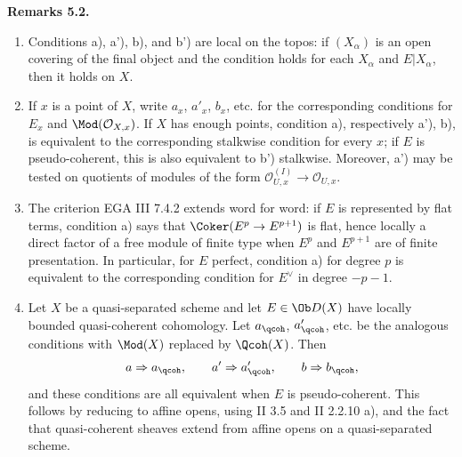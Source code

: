 \textbf{Remarks 5.2.}
\begin{enumerate}[label=\roman*)]
\item Conditions a), a'), b), and b') are local on the topos: if \((X_\alpha)\) is an open covering of the final object and the condition holds for each \(X_\alpha\) and \(E|X_\alpha\), then it holds on \(X\).
\item If \(x\) is a point of \(X\), write \(a_x\), \(a'_x\), \(b_x\), etc. for the corresponding conditions for \(E_x\) and \(\Mod(\mathcal O_{X,x})\). If \(X\) has enough points, condition a), respectively a'), b), is equivalent to the corresponding stalkwise condition for every \(x\); if \(E\) is pseudo-coherent, this is also equivalent to b') stalkwise. Moreover, a') may be tested on quotients of modules of the form \(\mathcal O_{U,x}^{(I)}\to\mathcal O_{U,x}\).
\item The criterion EGA III 7.4.2 extends word for word: if \(E\) is represented by flat terms, condition a) says that \(\Coker(E^p\to E^{p+1})\) is flat, hence locally a direct factor of a free module of finite type when \(E^p\) and \(E^{p+1}\) are of finite presentation. In particular, for \(E\) perfect, condition a) for degree \(p\) is equivalent to the corresponding condition for \(E^{\vee}\) in degree \(-p-1\).
\item Let \(X\) be a quasi-separated scheme and let \(E\in\Ob D(X)\) have locally bounded quasi-coherent cohomology. Let \(a_{\qcoh}\), \(a'_{\qcoh}\), etc. be the analogous conditions with \(\Mod(X)\) replaced by \(\Qcoh(X)\). Then
\[
 a\Rightarrow a_{\qcoh},\qquad
 a'\Rightarrow a'_{\qcoh},\qquad
 b\Rightarrow b_{\qcoh},
\]
and these conditions are all equivalent when \(E\) is pseudo-coherent. This follows by reducing to affine opens, using II 3.5 and II 2.2.10 a), and the fact that quasi-coherent sheaves extend from affine opens on a quasi-separated scheme.
\end{enumerate}

